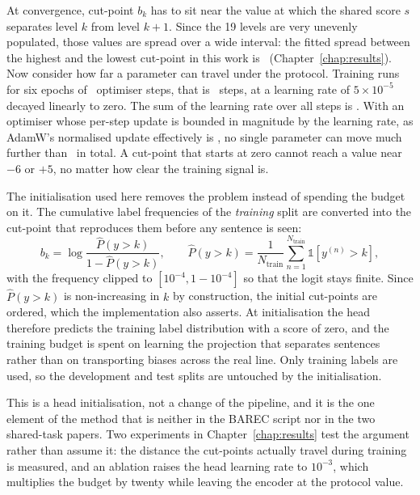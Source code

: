 At convergence, cut-point $b_k$ has to sit near the value at which the shared score $s$
separates level $k$ from level $k+1$. Since the 19 levels are very unevenly populated, those
values are spread over a wide interval: the fitted spread between the highest and the lowest
cut-point in this work is \cutSpreadCoral\ (Chapter~\ref{chap:results}). Now consider how far a
parameter can travel under the protocol. Training runs for six epochs of \stepsPerEpoch\
optimiser steps, that is \gpuTotalSteps\ steps, at a learning rate of $5\times10^{-5}$ decayed
linearly to zero. The sum of the learning rate over all steps is \lrSumEncoder. With an
optimiser whose per-step update is bounded in magnitude by the learning rate, as AdamW's
normalised update effectively is \cite{loshchilov2019adamw}, no single parameter can move much
further than \lrSumEncoder\ in total. A cut-point that starts at zero cannot reach a value near
$-6$ or $+5$, no matter how clear the training signal is.

The initialisation used here removes the problem instead of spending the budget on it. The
cumulative label frequencies of the \emph{training} split are converted into the cut-point that
reproduces them before any sentence is seen:
\begin{equation}
b_k = \log \frac{\hat{P}(y>k)}{1-\hat{P}(y>k)}, \qquad
\hat{P}(y>k) = \frac{1}{N_{\text{train}}}\sum_{n=1}^{N_{\text{train}}}\mathbb{1}\left[y^{(n)}>k\right],
\label{eq:coral-init}
\end{equation}
with the frequency clipped to $[10^{-4}, 1-10^{-4}]$ so that the logit stays finite. Since
$\hat{P}(y>k)$ is non-increasing in $k$ by construction, the initial cut-points are ordered,
which the implementation also asserts. At initialisation the head therefore predicts the
training label distribution with a score of zero, and the training budget is spent on learning
the projection that separates sentences rather than on transporting biases across the real
line. Only training labels are used, so the development and test splits are untouched by the
initialisation.

This is a head initialisation, not a change of the pipeline, and it is the one element of the
method that is neither in the BAREC script nor in the two shared-task papers. Two experiments
in Chapter~\ref{chap:results} test the argument rather than assume it: the distance the
cut-points actually travel during training is measured, and an ablation raises the head
learning rate to $10^{-3}$, which multiplies the budget by twenty while leaving the encoder at
the protocol value.

